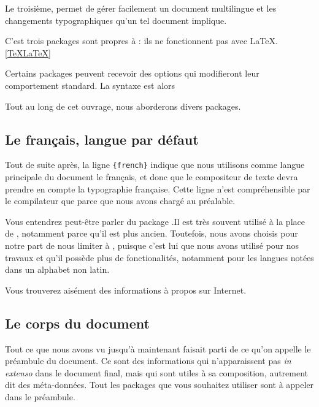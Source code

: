 Le troisième,  permet de gérer facilement un document multilingue et les changements typographiques qu'un tel document implique.

C'est trois packages sont propres à \XeLaTeX  : ils ne fonctionnent pas avec \LaTeX.\ref{TeXLaTeX}

Certains packages peuvent recevoir des options qui modifieront leur comportement standard. La syntaxe est alors 

Tout au long de cet ouvrage, nous aborderons divers packages.

\subsection{Le fran\c cais, langue par défaut\label{french}}

Tout de suite après, la ligne \verb|{french}| indique que nous utilisons comme langue principale du document le fran\c cais, et donc que le compositeur de texte devra prendre en compte la typographie fran\c caise. Cette ligne n'est compréhensible par le compilateur que parce que nous avons chargé  au préalable.

\begin{plusloins}
Vous entendrez peut-être parler du package .Il est très souvent utilisé à la place de , notamment parce qu'il est plus ancien. Toutefois, nous avons choisis pour notre part de nous limiter à , puisque c'est lui que nous avons utilisé pour nos travaux et qu'il possède plus de fonctionalités, notamment pour les langues notées dans un alphabet non latin.

Vous trouverez aisément des informations à propos  sur Internet.

\end{plusloins}

\subsection{Le corps du document}

Tout ce que nous avons vu jusqu'à maintenant faisait parti de ce qu'on appelle le préambule du document.\label{preambule} Ce sont des informations qui n'apparaissent pas \emph{in extenso} dans le document final, mais qui sont utiles à sa composition, autrement dit des méta-données. Tout les packages que vous souhaitez utiliser sont à appeler dans le préambule.

